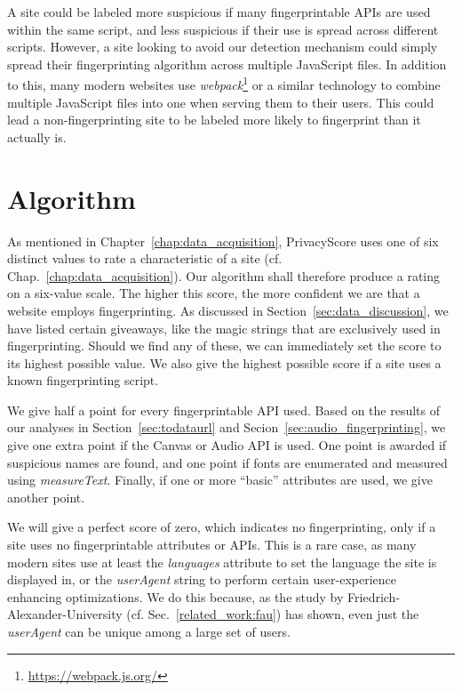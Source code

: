 \documentclass[
    fontsize=12pt,
    headings=small,
    parskip=half,
    bibliography=totoc,
    numbers=noenddot,
    open=any
    ]{scrreprt}
\begin{document}
A site could be labeled more suspicious if many fingerprintable APIs are used within the same script,
and less suspicious if their use is spread across different scripts.
However, a site looking to avoid our detection mechanism could simply
spread their fingerprinting algorithm across multiple JavaScript files.
In addition to this, many modern websites use \textit{webpack}\footnote{\url{https://webpack.js.org/}}
or a similar technology to combine multiple JavaScript files into one when serving
them to their users. This could lead a non-fingerprinting site to be labeled
more likely to fingerprint than it actually is.

\section{Algorithm}
As mentioned in Chapter~\ref{chap:data_acquisition}, PrivacyScore uses one of six distinct values
to rate a characteristic of a site (cf. Chap.~\ref{chap:data_acquisition}).
Our algorithm shall therefore produce a rating on a
six-value scale. The higher this score, the more confident we are that a website employs
fingerprinting. As discussed in Section~\ref{sec:data_discussion}, we have listed
certain giveaways, like the magic strings that are exclusively used in fingerprinting.
Should we find any of these, we can immediately set the score to its highest possible
value. We also give the highest possible score if a site uses a known fingerprinting
script.

We give half a point for every fingerprintable API used.
Based on the results of our analyses in Section~\ref{sec:todataurl} and
Secion~\ref{sec:audio_fingerprinting}, we give one extra point
if the Canvas or Audio API is used.
One point is awarded if suspicious names are found, and one point
if fonts are enumerated and measured using \textit{measureText}.
Finally, if one or more ``basic'' attributes are used, we give another point.

We will give a perfect score of zero, which indicates no fingerprinting, only
if a site uses no fingerprintable attributes or APIs.
This is a rare case, as many modern sites use at least the \textit{languages}
attribute to set the language the site is displayed in, or the \textit{userAgent} string to
perform certain user-experience enhancing optimizations.
We do this because, as the study by Friedrich-Alexander-University (cf. Sec.~\ref{related_work:fau})
has shown, even just the \textit{userAgent} can be unique among a large set of users.
\end{document}
